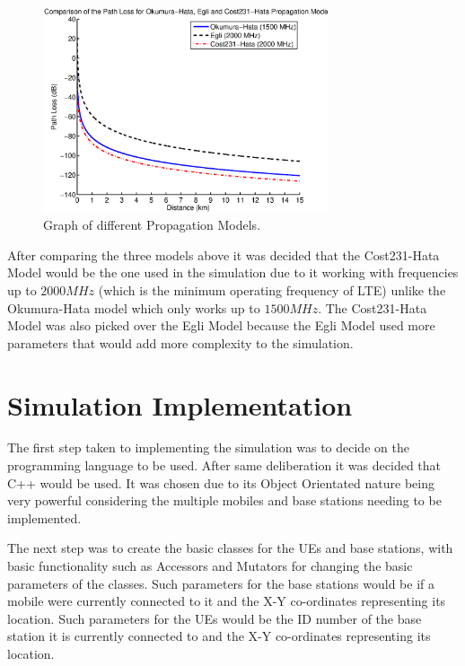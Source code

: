 \begin{figure}[H]
  \begin{center}
    	  \includegraphics[width=0.75\textwidth]{figures/simulation/prop.eps}
    \end{center}
    \caption{Graph of different Propagation Models.}
    \label{fig:prop}
\end{figure}
After comparing the three models above it was decided that the Cost231-Hata Model would be the one used in the simulation due to it working with frequencies up to $2000 MHz$ (which is the minimum operating frequency of LTE) unlike the Okumura-Hata model which only works up to $1500 MHz$. The Cost231-Hata Model was also picked over the Egli Model because the Egli Model used more parameters that would add more complexity to the simulation.~\cite{chebil2011comparison, shabbir2011comparison}

\section{Simulation Implementation}
The first step taken to implementing the simulation was to decide on the programming language to be used. After same deliberation it was decided that C++ would be used. It was chosen due to its Object Orientated nature being very powerful considering the multiple mobiles and base stations needing to be implemented.

The next step was to create the basic classes for the UEs and base stations, with basic functionality such as Accessors and Mutators for changing the basic parameters of the classes. Such parameters for the base stations would be if a mobile were currently connected to it and the X-Y co-ordinates representing its location. Such parameters for the UEs would be the ID number of the base station it is currently connected to and the X-Y co-ordinates representing its location.

